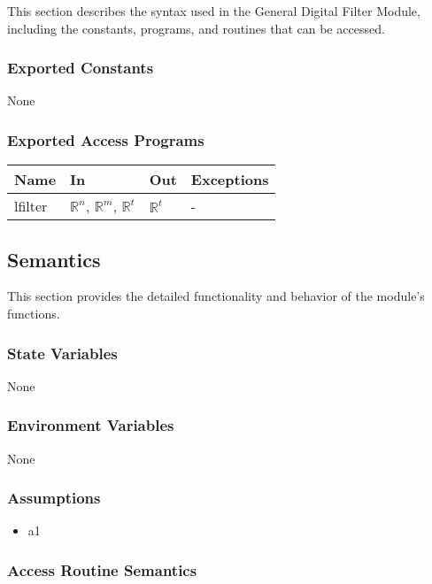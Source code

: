 \documentclass[12pt, titlepage]{article}
\begin{document}
This section describes the syntax used in the General Digital Filter Module,
including the constants, programs, and routines that can be accessed.

\subsubsection{Exported Constants}

None

\subsubsection{Exported Access Programs}

\begin{center}
\begin{tabular}{p{2cm} p{4cm} p{4cm} p{2cm}}
\hline
\textbf{Name} & \textbf{In} & \textbf{Out} & \textbf{Exceptions} \\
\hline
lfilter & $\mathbb{R}^n$, $\mathbb{R}^m$, $\mathbb{R}^t$ & $\mathbb{R}^t$ & - \\
\hline
\end{tabular}
\end{center}

\subsection{Semantics}

This section provides the detailed functionality and behavior of the module’s
functions.

\subsubsection{State Variables}

None

\subsubsection{Environment Variables}

None

\subsubsection{Assumptions}

\begin{itemize}
\item a1
\end{itemize}

\subsubsection{Access Routine Semantics}
\end{document}
